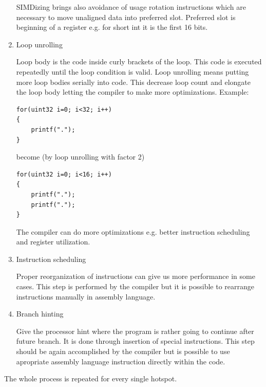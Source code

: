 \begin{enumerate}
\par
SIMDizing brings also avoidance of usage rotation instructions which are necessary to move unaligned data into preferred slot.
Preferred slot is beginning of a register e.g. for short int it is the first 16 bits.

\item{Loop unrolling}
\par
Loop body is the code inside curly brackets of the loop.
This code is executed repeatedly until the loop condition is valid.
Loop unrolling means putting more loop bodies serially into code.
This decrease loop count and elongate the loop body letting the compiler to make more optimizations.
Example:
\begin{verbatim}
for(uint32 i=0; i<32; i++)
{
    printf(".");
}
\end{verbatim}
become (by loop unrolling with factor 2)
\begin{verbatim}
for(uint32 i=0; i<16; i++)
{
    printf(".");
    printf(".");
}
\end{verbatim}
The compiler can do more optimizations e.g. better instruction scheduling and register utilization.

\item{Instruction scheduling}
\par
Proper reorganization of instructions can give us more performance in some cases.
This step is performed by the compiler but it is possible to rearrange instructions manually in assembly language.

\item{Branch hinting}
\par
Give the processor hint where the program is rather going to continue after future branch.
It is done through insertion of special instructions.
This step should be again accomplished by the compiler but is possible to use apropriate assembly language instruction directly within the code.
\end{enumerate}

\par
The whole process is repeated for every single hotspot.

